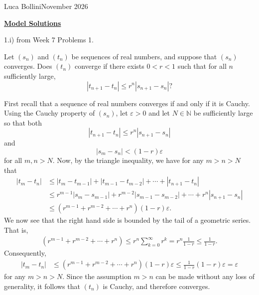\documentclass[12pt,a4paper]{article}
\newcommand{\thetitle}{Model Solutions}
\newcommand{\theauthor}{Luca Bollini}
\newcommand{\thedate}{November 2026}
\newcommand{\N}{\mathbb{N}}
\newcommand{\eps}{\varepsilon}
\begin{document}

\vspace{2mm}
{\sc  \theauthor}\hfill{\sc \thedate}

\vspace{3mm}

\begin{center}
{\large \textbf {\underline{\thetitle}}}
\end{center}

\vspace{3mm}

1.i) from Week 7 Problems 1.

\begin{questionbox}
    Let $(s_n)$ and $(t_n)$ be sequences of real numbers, and suppose that $(s_n)$ converges. Does $(t_n)$ converge if there exists $0<r<1$ such that for all $n$ sufficiently large,
    \[
    |t_{n+1}-t_{n}| \leq r^n|s_{n+1}-s_n|\text{?}
    \]
\end{questionbox}

First recall that a sequence of real numbers converges if and only if it is Cauchy. Using the Cauchy property of $(s_n)$, let $\eps>0$ and let $N\in\N$ be sufficiently large so that both
\[
|t_{n+1}-t_{n}| \leq r^n|s_{n+1}-s_n|
\]
and
\[
|s_{m}-s_n|<(1-r)\eps
\]
for all $m,n>N$. Now, by the triangle inequality, we have for any $m>n>N$ that
\begin{align*}
    |t_{m}-t_{n}| &\leq |t_{m}-t_{m-1}|+|t_{m-1}-t_{m-2}|+\cdots+|t_{n+1}-t_{n}|\\
    &\leq r^{m-1}|s_{m}-s_{m-1}|+r^{m-2}|s_{m-1}-s_{m-2}|+\cdots+r^n|s_{n+1}-s_{n}|\\
    &\leq (r^{m-1}+r^{m-2}+\cdots+r^n)(1-r)\eps.
\end{align*}
We now see that the right hand side is bounded by the tail of a geometric series. That is,
\begin{align*}
    (r^{m-1}+r^{m-2}+\cdots+r^n)\leq r^n\sum_{k=0}^\infty r^k = r^n\frac{1}{1-r}\leq \frac{1}{1-r}.
\end{align*}
Consequently,
\begin{align*}
    |t_{m}-t_{n}| &\leq (r^{m-1}+r^{m-2}+\cdots+r^n)(1-r)\eps\leq \frac{1}{1-r}(1-r)\eps = \eps
\end{align*}
for any $m>n>N$. Since the assumption $m>n$ can be made without any loss of generality, it follows that $(t_n)$ is Cauchy, and therefore converges.
\end{document}
